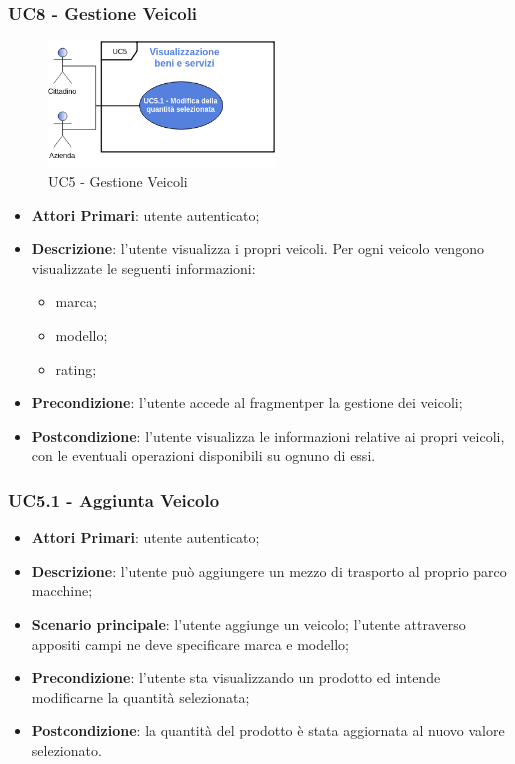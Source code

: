  \subsubsection{UC8 - Gestione Veicoli}
  \begin{figure}[H]
 	\includegraphics[width=6cm]{res/images/UC5-Generale.png}
 	\centering
 	\caption{UC5 - Gestione Veicoli}
 \end{figure}
 \begin{itemize}
 	\item \textbf{Attori Primari}: utente autenticato;
 	\item \textbf{Descrizione}: l'utente visualizza i propri veicoli. Per ogni veicolo vengono visualizzate le seguenti informazioni:
 	\begin{itemize}
 		\item marca;
 		\item modello;
 		\item rating;
 	\end{itemize}
 	\item \textbf{Precondizione}: l'utente accede al fragment\glosp per la gestione dei veicoli;
 	\item \textbf{Postcondizione}: l'utente visualizza le informazioni relative ai propri veicoli, con le eventuali operazioni disponibili su ognuno di essi.
 \end{itemize}
 \subsubsection{UC5.1 - Aggiunta Veicolo}
 \begin{itemize}
 	\item \textbf{Attori Primari}: utente autenticato;
 	\item \textbf{Descrizione}: l'utente può aggiungere un mezzo di trasporto al proprio parco macchine;
 	\item \textbf{Scenario principale}: l'utente aggiunge un veicolo; l'utente attraverso appositi campi ne deve specificare marca e modello;
 	\item \textbf{Precondizione}: l'utente sta visualizzando un prodotto ed intende modificarne la quantità selezionata;
 	\item \textbf{Postcondizione}: la quantità del prodotto è stata aggiornata al nuovo valore selezionato.
 \end{itemize}